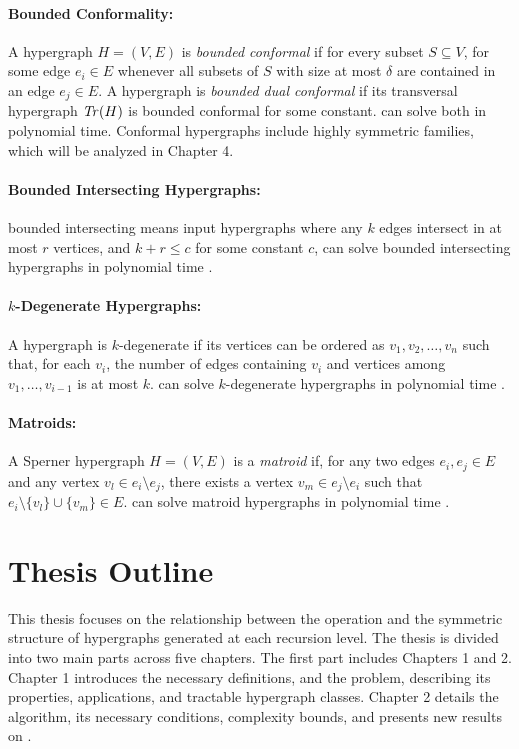 \paragraph{Bounded Conformality:} A hypergraph $H=(V,E)$ is \emph{bounded conformal} if for every subset $S\subseteq V$,   for some edge $e_i\in E$ whenever all subsets of $S$ with size at most $\delta$ are contained in an edge $e_j\in E$. A hypergraph is \emph{bounded dual conformal} if its transversal hypergraph $\mathit{Tr}(H)$ is bounded conformal for some constant. \TransHyp{} can solve both in polynomial time. \cite{Hag08} Conformal hypergraphs include highly symmetric families, which will be analyzed in Chapter 4.

\paragraph{Bounded Intersecting Hypergraphs:} bounded intersecting means input hypergraphs where any $k$ edges intersect in at most $r$ vertices, and $k+r\leq c$ for some constant $c$, \TransHyp{} can solve bounded intersecting hypergraphs in polynomial time \cite{KBEG06}.

\paragraph{$k$-Degenerate Hypergraphs:} A hypergraph is $k$-degenerate if its vertices can be ordered as $v_1,v_2,\dots,v_n$ such that, for each $v_i$, the number of edges containing $v_i$ and vertices among $v_1,\dots,v_{i-1}$ is at most $k$. \TransHyp{} can solve $k$-degenerate hypergraphs in polynomial time \cite{EGM03}.

\paragraph{Matroids:} A Sperner hypergraph $H=(V,E)$ is a \emph{matroid} if, for any two edges $e_i,e_j\in E$ and any vertex $v_l\in e_i\setminus e_j$, there exists a vertex $v_m\in e_j\setminus e_i$ such that $e_i\setminus\{v_l\}\cup\{v_m\}\in E$. \TransHyp{} can solve matroid hypergraphs in polynomial time \cite{Ber87}.

\section{Thesis Outline}

This thesis focuses on the relationship between the \FKA{} operation and the symmetric structure of hypergraphs generated at each recursion level. The thesis is divided into two main parts across five chapters. The first part includes Chapters 1 and 2. Chapter 1 introduces the necessary definitions, and the \TransHyp{} problem, describing its properties, applications, and tractable hypergraph classes. Chapter 2 details the \FKA{} algorithm, its necessary conditions, complexity bounds, and presents new results on \TransHyp.

